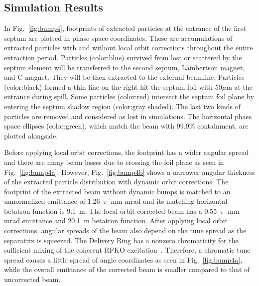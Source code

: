 \documentclass[aps,prstab,onecolumn,preprint]{revtex4-1}
\begin{document}
\subsection{\label{sec:bump2}Simulation Results}

In Fig.~\ref{fig:bump4}, footprints of extracted particles at the entrance of the first septum are plotted in phase space coordinates. These are accumulations of extracted particles with and without local orbit corrections throughout the entire extraction period. Particles (color:blue) survived from lost or scattered by the septum element will be transferred to the second septum, Lambertson magnet, and C-magnet. They will be then extracted to the external beamline. Particles (color:black) formed a thin line on the right hit the septum foil with 50$\mu$m at the entrance during spill. Some particles (color:red) intersect the septum foil plane by entering the septum shadow region (color:gray shaded). The last two kinds of particles are removed and considered as lost in simulations. The horizontal phase space ellipses (color:green), which match the beam with 99.9\% containment, are plotted alongside.

Before applying local orbit corrections, the footprint has a wider angular spread and there are many beam losses due to crossing the foil plane as seen in Fig.~\ref{fig:bump4a}. However, Fig.~\ref{fig:bump4b} shows a narrower angular thickness of the extracted particle distribution with dynamic orbit corrections. The footprint of the extracted beam without dynamic bumps is matched to an unnormalized emittance of 1.26~$\pi$~mm-mrad and its matching horizontal betatron function is 9.1~m. The local orbit corrected beam has a 0.55~$\pi$~mm-mrad emittance and 20.1~m betatron function. After applying local orbit corrections, angular spreads of the beam also depend on the tune spread as the separatrix is squeezed. The Delivery Ring has a nonzero chromaticity for the sufficient mixing of the coherent RFKO excitation~\cite{ipac11}. Therefore, a chromatic tune spread causes a little spread of angle coordinates as seen in Fig.~\ref{fig:bump4a}, while the overall emittance of the corrected beam is smaller compared to that of uncorrected beam.
\end{document}
